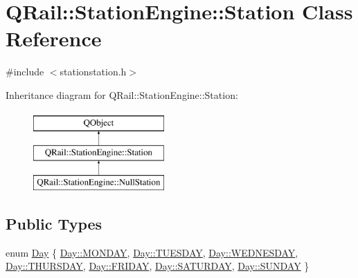 \hypertarget{classQRail_1_1StationEngine_1_1Station}{}\section{Q\+Rail\+::Station\+Engine\+::Station Class Reference}
\label{classQRail_1_1StationEngine_1_1Station}


{\ttfamily \#include $<$stationstation.\+h$>$}

Inheritance diagram for Q\+Rail\+::Station\+Engine\+::Station\+:\begin{figure}[H]
\begin{center}
\leavevmode
\includegraphics[height=3.000000cm]{classQRail_1_1StationEngine_1_1Station}
\end{center}
\end{figure}
\subsection*{Public Types}
\begin{DoxyCompactItemize}
\item 
enum \mbox{\hyperlink{classQRail_1_1StationEngine_1_1Station_ae8c109a1d5ce2bb41959e62e32392631}{Day}} \{ \newline
\mbox{\hyperlink{classQRail_1_1StationEngine_1_1Station_ae8c109a1d5ce2bb41959e62e32392631a98617021b249af0ace0f84ee92ccc7cd}{Day\+::\+M\+O\+N\+D\+AY}}, 
\mbox{\hyperlink{classQRail_1_1StationEngine_1_1Station_ae8c109a1d5ce2bb41959e62e32392631a5f5140afce13197a89e848004f292f14}{Day\+::\+T\+U\+E\+S\+D\+AY}}, 
\mbox{\hyperlink{classQRail_1_1StationEngine_1_1Station_ae8c109a1d5ce2bb41959e62e32392631aaaebdc947e9f7d4ea362e5dc4fe7f825}{Day\+::\+W\+E\+D\+N\+E\+S\+D\+AY}}, 
\mbox{\hyperlink{classQRail_1_1StationEngine_1_1Station_ae8c109a1d5ce2bb41959e62e32392631a7a61b324afb4dd8b2fb4a38afc34f755}{Day\+::\+T\+H\+U\+R\+S\+D\+AY}}, 
\newline
\mbox{\hyperlink{classQRail_1_1StationEngine_1_1Station_ae8c109a1d5ce2bb41959e62e32392631a86fb6d343289267f3e9edb9b7403d936}{Day\+::\+F\+R\+I\+D\+AY}}, 
\mbox{\hyperlink{classQRail_1_1StationEngine_1_1Station_ae8c109a1d5ce2bb41959e62e32392631afd5ae113ac00b67f69541bc8c7f21ef7}{Day\+::\+S\+A\+T\+U\+R\+D\+AY}}, 
\mbox{\hyperlink{classQRail_1_1StationEngine_1_1Station_ae8c109a1d5ce2bb41959e62e32392631a95fa12cb2100ce7081b71f7c44bc12a5}{Day\+::\+S\+U\+N\+D\+AY}}
 \}
\end{DoxyCompactItemize}
